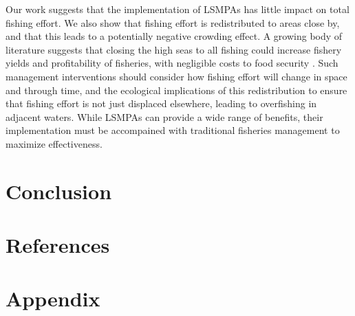 \documentclass[9pttwoside,lineno]{pnas-new}
\begin{document}
Our work suggests that the implementation of LSMPAs has little impact on
total fishing effort. We also show that fishing effort is
redistributed to areas close by, and that this leads to a potentially
negative crowding effect. A growing body of literature suggests that
closing the high seas to all fishing could increase fishery yields and
profitability of fisheries, with negligible costs to food security
\citep{white_2014,sumaila_2015,sala_2018a,schiller_2018}. Such
management interventions should consider how fishing effort will change
in space and through time, and the ecological implications of this
redistribution to ensure that fishing effort is not just displaced
elsewhere, leading to overfishing in adjacent waters. While LSMPAs can
provide a wide range of benefits, their implementation must be
accompained with traditional fisheries management to maximize
effectiveness.

\section{Conclusion}\label{conclude}

\clearpage

\section{References}\label{references}


\clearpage

\FloatBarrier

\hypertarget{appendix}{%
\section{Appendix}\label{appendix}}

\newcommand{\beginsupplement}{\setcounter{table}{0}  \renewcommand{\thetable}{S\arabic{table}} \setcounter{figure}{0} \renewcommand{\thefigure}{S\arabic{figure}}}

\setcounter{table}{0}  \renewcommand{\thetable}{S\arabic{table}} \setcounter{figure}{0} \renewcommand{\thefigure}{S\arabic{figure}}

%
\end{document}
